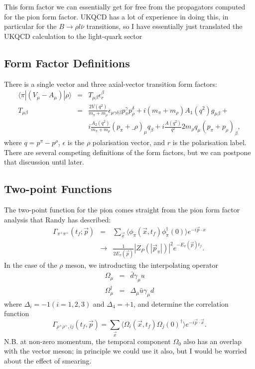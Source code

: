 \documentclass[12pt]{article}
\newcommand{\pdotx}{\vec{p} \cdot \vec{x}}
\begin{document}
This form factor we can essentially get for free from the propagators
computed for the pion form factor.  UKQCD has a lot of experience in
doing this, in particular for the $B \longrightarrow \rho l \bar{\nu}$
transitions, so I have essentially just translated the UKQCD calculation to
the light-quark sector\cite{ukqcd95}

\subsection{Form Factor Definitions}
There is a single vector and three axial-vector transition form
factors:
\begin{eqnarray}
\langle \pi | (V_{\mu} - A_{\mu}) | \rho \rangle & = & T_{\mu\beta}
\epsilon_r^{\beta}\\
T_{\mu\beta} & = & \frac{2V(q^2)}{m_\pi + m_{\rho}}
\epsilon_{\mu\gamma\delta\beta} p^{\gamma}_{\pi} p^{\delta}_{\rho} + i
(m_{\pi} + m_{\rho}) A_1(q^2) g_{\mu\beta}+ \nonumber \\
& & i \frac{A_2(q^2)}{m_\pi + m_{\rho}}(p_\pi + \_\rho)_{\mu}
q_{\beta} + i \frac{A(q^2)}{q^2} 2 m_{\rho} q_{\mu} (p_\pi +
p_{\rho})_{\beta},
\end{eqnarray}
where $q = p^\pi - p^\rho$, $\epsilon$ is the $\rho$ polarisation
vector, and $r$ is the polarisation label.  There are several
competing definitions of the form factors, but we can postpone that
discussion until later.

\subsection{Two-point Functions}
The two-point function for the pion comes straight from the pion form
factor analysis that Randy has described:
\begin{eqnarray}
\Gamma_{\pi^+ \pi^+}(t_f; \vec{p}) & = & \sum_{\vec{x}} \langle
\phi_{\pi}(\vec{x}, t_f) \phi_{\pi}^{\dagger} (0) \rangle e^{- i
\vec{p}\cdot x}\\ & \longrightarrow & \frac{1}{2 E_{\pi}(\vec{p})}
|Z_P(|\vec{p}_{\pi}|)|^2 e^{- E_{\pi}(\vec{p}) t_f}.
\end{eqnarray}
In the case of the $\rho$ meson, we introducting the interpolating
operator
\begin{eqnarray}
\Omega_{\mu} & = & \bar{d} \gamma_\mu u \nonumber \\
\Omega_{\mu}^{\dagger} & = & \Delta_\mu \bar{u} \gamma_\mu d
\end{eqnarray}
where $\Delta_i = -1 (i = 1,2,3)$ and $\Delta_4 = +1$,
and determine the correlation function
\begin{equation}
\Gamma_{\rho^+ \rho^+, ij}(t_f, \vec{p}) = \sum_{\vec{x}} \langle
\Omega_i(\vec{x}, t_f) \Omega_j(0)^{\dagger} \rangle e^{-i\pdotx}.\label{eq:rho_2pt}
\end{equation}
{\cal N.B.} at non-zero momentum, the temporal component $\Omega_0$
also has an overlap with the vector meson; in principle we could use
it also, but I would be worried about the effect of smearing.
\end{document}
